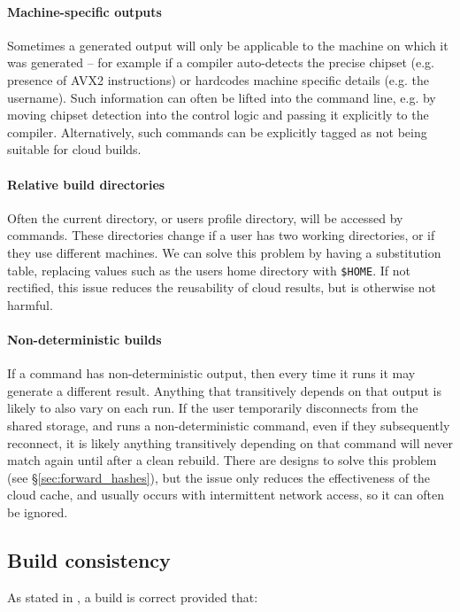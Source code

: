 \paragraph{Machine-specific outputs} Sometimes a generated output will only be applicable to the machine on which it was generated -- for example if a compiler auto-detects the precise chipset (e.g. presence of AVX2 instructions) or hardcodes machine specific details (e.g. the username). Such information can often be lifted into the command line, e.g. by moving chipset detection into the control logic and passing it explicitly to the compiler. Alternatively, such commands can be explicitly tagged as not being suitable for cloud builds.

\paragraph{Relative build directories} Often the current directory, or users profile directory, will be accessed by commands. These directories change if a user has two working directories, or if they use different machines. We can solve this problem by having a substitution table, replacing values such as the users home directory with \texttt{\$HOME}. If not rectified, this issue reduces the reusability of cloud results, but is otherwise not harmful.

\paragraph{Non-deterministic builds} If a command has non-deterministic output, then every time it runs it may generate a different result. Anything that transitively depends on that output is likely to also vary on each run. If the user temporarily disconnects from the shared storage, and runs a non-deterministic command, even if they subsequently reconnect, it is likely anything transitively depending on that command will never match again until after a clean rebuild. There are designs to solve this problem (see \S\ref{sec:forward_hashes}), but the issue only reduces the effectiveness of the cloud cache, and usually occurs with intermittent network access, so it can often be ignored.

\subsection{Build consistency}
\label{sec:hazards}

As stated in \citet[\S3.6]{build_systems_a_la_carte}, a build is correct provided that:


